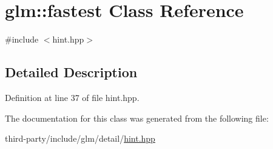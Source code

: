 \hypertarget{classglm_1_1fastest}{}\section{glm\+:\+:fastest Class Reference}
\label{classglm_1_1fastest}


{\ttfamily \#include $<$hint.\+hpp$>$}



\subsection{Detailed Description}


Definition at line 37 of file hint.\+hpp.



The documentation for this class was generated from the following file\+:\begin{DoxyCompactItemize}
\item 
third-\/party/include/glm/detail/\hyperlink{hint_8hpp}{hint.\+hpp}\end{DoxyCompactItemize}
